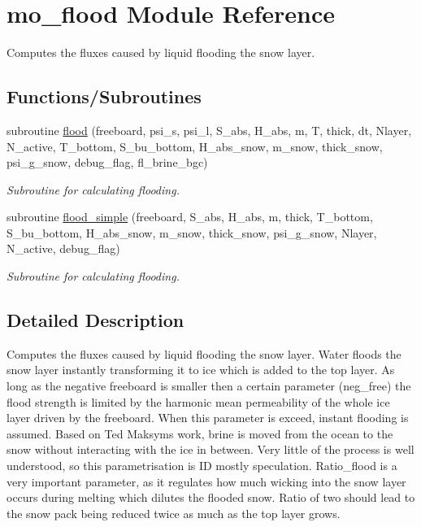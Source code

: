 \hypertarget{namespacemo__flood}{
\section{mo\_\-flood Module Reference}
\label{namespacemo__flood}
}


Computes the fluxes caused by liquid flooding the snow layer.  


\subsection*{Functions/Subroutines}
\begin{DoxyCompactItemize}
\item 
subroutine \hyperlink{namespacemo__flood_afd760054790f70911ffe84a82e402840}{flood} (freeboard, psi\_\-s, psi\_\-l, S\_\-abs, H\_\-abs, m, T, thick, dt, Nlayer, N\_\-active, T\_\-bottom, S\_\-bu\_\-bottom, H\_\-abs\_\-snow, m\_\-snow, thick\_\-snow, psi\_\-g\_\-snow, debug\_\-flag, fl\_\-brine\_\-bgc)
\begin{DoxyCompactList}\small\item\em Subroutine for calculating flooding. \item\end{DoxyCompactList}\item 
subroutine \hyperlink{namespacemo__flood_ac2e89f500f5c985c74a9521783ca4bce}{flood\_\-simple} (freeboard, S\_\-abs, H\_\-abs, m, thick, T\_\-bottom, S\_\-bu\_\-bottom, H\_\-abs\_\-snow, m\_\-snow, thick\_\-snow, psi\_\-g\_\-snow, Nlayer, N\_\-active, debug\_\-flag)
\begin{DoxyCompactList}\small\item\em Subroutine for calculating flooding. \item\end{DoxyCompactList}\end{DoxyCompactItemize}


\subsection{Detailed Description}
Computes the fluxes caused by liquid flooding the snow layer. Water floods the snow layer instantly transforming it to ice which is added to the top layer. As long as the negative freeboard is smaller then a certain parameter (neg\_\-free) the flood strength is limited by the harmonic mean permeability of the whole ice layer driven by the freeboard. When this parameter is exceed, instant flooding is assumed. Based on Ted Maksyms work, brine is moved from the ocean to the snow without interacting with the ice in between. Very little of the process is well understood, so this parametrisation is ID mostly speculation. Ratio\_\-flood is a very important parameter, as it regulates how much wicking into the snow layer occurs during melting which dilutes the flooded snow. Ratio of two should lead to the snow pack being reduced twice as much as the top layer grows.

